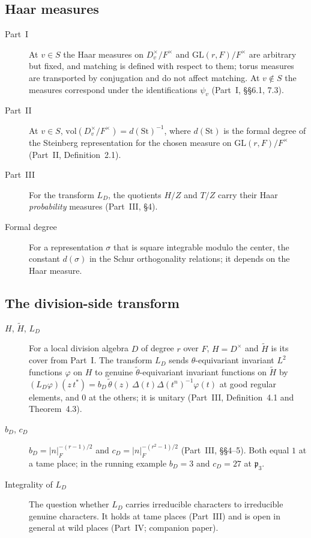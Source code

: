 \subsection{Haar measures}\label{gl:measures}
\begin{description}
\item[Part~I] At $v\in S$ the Haar measures on $D_v^\times/F^\times$
and $\mathrm{GL}(r,F)/F^\times$ are arbitrary but fixed, and matching
is defined with respect to them; torus measures are transported by
conjugation and do not affect matching.  At $v\notin S$ the measures
correspond under the identifications $\psi_v$ (Part~I, \S\S6.1, 7.3).
\item[Part~II] At $v\in S$,
$\mathrm{vol}(D_v^\times/F^\times)=d(\mathrm{St})^{-1}$, where
$d(\mathrm{St})$ is the formal degree of the Steinberg representation
for the chosen measure on $\mathrm{GL}(r,F)/F^\times$ (Part~II,
Definition~2.1).
\item[Part~III] For the transform $L_D$, the quotients $H/Z$ and
$T/Z$ carry their Haar \emph{probability} measures (Part~III, \S4).
\item[Formal degree] For a representation $\sigma$ that is square
integrable modulo the center, the constant $d(\sigma)$ in the Schur
orthogonality relations; it depends on the Haar measure.
\end{description}

\subsection{The division-side transform}\label{gl:transform}
\begin{description}
\item[$H$, $\widetilde H$, $L_D$] For a local division algebra $D$ of
degree $r$ over $F$, $H=D^\times$ and $\widetilde H$ is its cover from
Part~I.  The transform $L_D$ sends $\theta$-equivariant invariant
$L^2$ functions $\varphi$ on $H$ to genuine
$\tilde\theta$-equivariant invariant functions on $\widetilde H$ by
$(L_D\varphi)(z\,t^*)=b_D\,\tilde\theta(z)\,\Delta(t)\Delta(t^n)^{-1}\varphi(t)$
at good regular elements, and $0$ at the others; it is unitary
(Part~III, Definition~4.1 and Theorem~4.3).
\item[$b_D$, $c_D$] $b_D=|n|_F^{-(r-1)/2}$ and
$c_D=|n|_F^{-(r^2-1)/2}$ (Part~III, \S\S4--5).  Both equal $1$ at a
tame place; in the running example $b_D=3$ and $c_D=27$ at
$\mathfrak p_3$.
\item[Integrality of $L_D$] The question whether $L_D$ carries
irreducible characters to irreducible genuine characters.  It holds at
tame places (Part~III) and is open in general at wild places
(Part~IV; companion paper).
\end{description}

